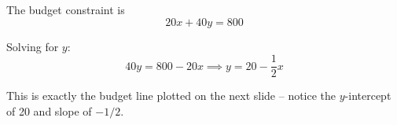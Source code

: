 \documentclass{beamer}
\begin{document}
\begin{frame}

  \bigskip
  The budget constraint is
  $$
    20x + 40y = 800
  $$

  \bigskip
  Solving for $y$:
  $$
    40y = 800 - 20x \implies y = 20 - \frac{1}{2}x
  $$

  \bigskip
  This is exactly the budget line plotted on the next slide -- notice the $y$-intercept of 20 and slope of $-1/2$.
\end{frame}

\end{document}
